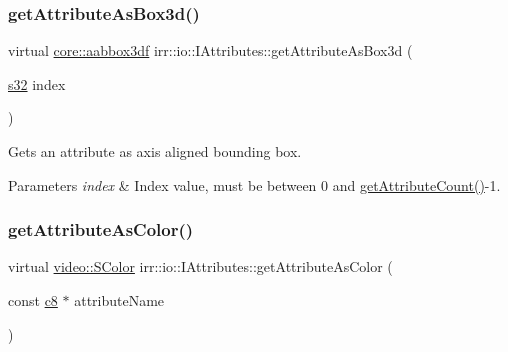 \subsubsection{\texorpdfstring{get\+Attribute\+As\+Box3d()}{getAttributeAsBox3d()}\hspace{0.1cm}{\footnotesize\ttfamily [2/2]}}
{\footnotesize\ttfamily virtual \hyperlink{namespaceirr_1_1core_adfc8fa01b30044c55f3332a1d6c1aa19}{core\+::aabbox3df} irr\+::io\+::\+I\+Attributes\+::get\+Attribute\+As\+Box3d (\begin{DoxyParamCaption}\item[{\hyperlink{namespaceirr_ac66849b7a6ed16e30ebede579f9b47c6}{s32}}]{index }\end{DoxyParamCaption})\hspace{0.3cm}{\ttfamily [pure virtual]}}



Gets an attribute as axis aligned bounding box. 


\begin{DoxyParams}{Parameters}
{\em index} & Index value, must be between 0 and \hyperlink{classirr_1_1io_1_1IAttributes_a796bdd9440ee7ba0b6742a90a82870b6}{get\+Attribute\+Count()}-\/1. \\
\hline
\end{DoxyParams}
\mbox{\label{classirr_1_1io_1_1IAttributes_a72b576b9ba7332952cdb86c60dae2fee}} 
\subsubsection{\texorpdfstring{get\+Attribute\+As\+Color()}{getAttributeAsColor()}\hspace{0.1cm}{\footnotesize\ttfamily [1/2]}}
{\footnotesize\ttfamily virtual \hyperlink{classirr_1_1video_1_1SColor}{video\+::\+S\+Color} irr\+::io\+::\+I\+Attributes\+::get\+Attribute\+As\+Color (\begin{DoxyParamCaption}\item[{const \hyperlink{namespaceirr_a9395eaea339bcb546b319e9c96bf7410}{c8} $\ast$}]{attribute\+Name }\end{DoxyParamCaption})\hspace{0.3cm}{\ttfamily [pure virtual]}}



